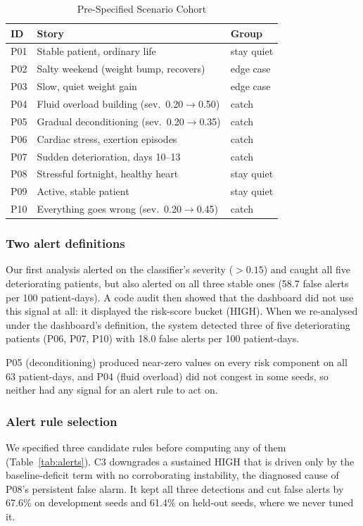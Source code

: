 \documentclass[conference]{IEEEtran}
\begin{document}
\begin{table}[!t]
\centering
\caption{Pre-Specified Scenario Cohort}
\label{tab:cohort}
\footnotesize
\begin{tabularx}{\columnwidth}{@{}P{0.55cm}YP{1.9cm}@{}}
\toprule
\textbf{ID} & \textbf{Story} & \textbf{Group} \\
\midrule
P01 & Stable patient, ordinary life & stay quiet \\
P02 & Salty weekend (weight bump, recovers) & edge case \\
P03 & Slow, quiet weight gain & edge case \\
P04 & Fluid overload building (sev.\ 0.20$\rightarrow$0.50) & catch \\
P05 & Gradual deconditioning (sev.\ 0.20$\rightarrow$0.35) & catch \\
P06 & Cardiac stress, exertion episodes & catch \\
P07 & Sudden deterioration, days 10--13 & catch \\
P08 & Stressful fortnight, healthy heart & stay quiet \\
P09 & Active, stable patient & stay quiet \\
P10 & Everything goes wrong (sev.\ 0.20$\rightarrow$0.45) & catch \\
\bottomrule
\end{tabularx}
\end{table}

\subsubsection{Two alert definitions}
Our first analysis alerted on the classifier's severity ($>0.15$) and caught all five deteriorating patients, but also alerted on all three stable ones (58.7 false alerts per 100 patient-days). A code audit then showed that the dashboard did not use this signal at all: it displayed the risk-score bucket (HIGH). When we re-analysed under the dashboard's definition, the system detected three of five deteriorating patients (P06, P07, P10) with 18.0 false alerts per 100 patient-days.

P05 (deconditioning) produced near-zero values on every risk component on all 63 patient-days, and P04 (fluid overload) did not congest in some seeds, so neither had any signal for an alert rule to act on.

\subsubsection{Alert rule selection}
We specified three candidate rules before computing any of them (Table~\ref{tab:alerts}). C3 downgrades a sustained HIGH that is driven only by the baseline-deficit term with no corroborating instability, the diagnosed cause of P08's persistent false alarm. It kept all three detections and cut false alerts by 67.6\% on development seeds and 61.4\% on held-out seeds, where we never tuned it.
\end{document}
